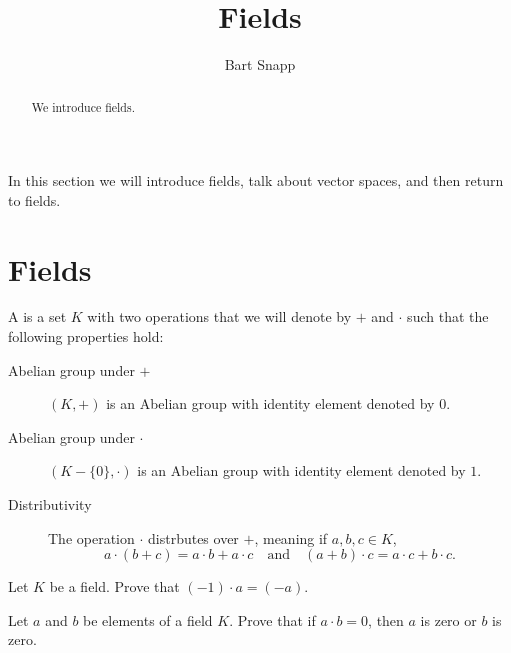 \documentclass{ximera}
\author{Bart Snapp}
\title{Fields}
\begin{document}
\begin{abstract}
  We introduce fields.
\end{abstract}
\maketitle


In this section we will introduce fields, talk about vector spaces,
and then return to fields.


\section{Fields}


\begin{definition}
  A  is a set $K$ with two operations that we will denote
  by $+$ and $\cdot$ such that the following properties hold:
  \begin{description}
  \item[Abelian group under $\pmb{+}$] $(K,+)$ is an Abelian
    group with identity element denoted by $0$.
  \item[Abelian group under $\pmb{\cdot}$] $(K-\{0\},\cdot)$ is
    an Abelian group with identity element denoted by $1$.
  \item[Distributivity] The operation $\cdot$ distrbutes over $+$,
    meaning if $a,b,c\in K$,
    \[
    a\cdot (b+ c) = a\cdot b+ a\cdot c \quad\text{and}\quad (a+ b)\cdot c  = a\cdot c+ b\cdot c.
    \]
  \end{description}
\end{definition}


\begin{exercise}
  Let $K$ be a field. Prove that $(-1)\cdot a = (-a)$.
\end{exercise}


\begin{exercise} 
  Let $a$ and $b$ be elements of a field $K$. Prove that if $a\cdot b
  = 0$, then $a$ is zero or $b$ is zero. 
\end{exercise}
\end{document}
